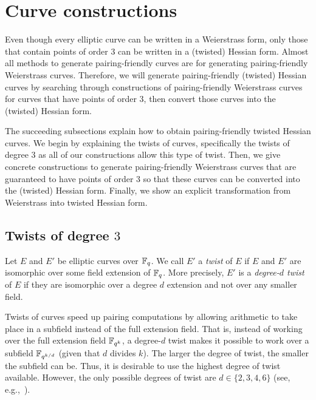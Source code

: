 \section{Curve constructions}
\label{sec:curves}

Even though every elliptic curve can be written in a Weierstrass form,
only those that contain points of order 3 can be written in a (twisted) Hessian form.
Almost all methods to generate pairing-friendly curves are for generating
pairing-friendly Weierstrass curves.
Therefore, we will generate pairing-friendly (twisted) Hessian curves by
searching through constructions of pairing-friendly Weierstrass curves for curves that have points of order 3,
then convert those curves into the (twisted) Hessian form.

The succeeding subsections explain how to obtain pairing-friendly twisted Hessian curves.
We begin by explaining the twists of curves, specifically the twists of degree $3$
as all of our constructions allow this type of twist.
Then, we give concrete constructions to generate pairing-friendly Weierstrass curves that are guaranteed to have points of order 3
so that these curves can be converted into the (twisted) Hessian form.
Finally, we show an explicit transformation from Weierstrass into twisted Hessian form.


\subsection{Twists of degree $3$}
\label{twist}
Let $E$ and $E'$ be elliptic curves over $\mathbb{F}_{q}$.
We call $E'$ a \emph{twist} of $E$ if $E$ and $E'$ are isomorphic over some field extension of $\mathbb{F}_{q}$.
More precisely, $E'$ is a {\emph{degree-$d$ twist}} of $E$ if they are isomorphic over a degree $d$ extension and not over any smaller field.

Twists of curves speed up pairing computations by allowing arithmetic to take place in a subfield instead of the full extension field.
That is, instead of working over the full extension field $\mathbb{F}_{q^k}$, a degree-$d$ twist makes it possible to work over a subfield $\mathbb{F}_{q^{k/d}}$
(given that $d$ divides $k$).
The larger the degree of twist, the smaller the subfield can be.
Thus, it is desirable to use the highest degree of twist available.
However, the only possible degrees of twist are $d \in \{2,3,4,6\}$ (see, e.g.,~\cite{2009/silverman-arithmetic}).

